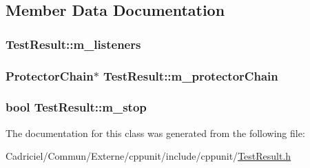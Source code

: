 \subsection{Member Data Documentation}
\hypertarget{class_test_result_a6e5daf8393ca6cdd5a9c3b44074b037b}{
\subsubsection[{m\-\_\-listeners}]{ Test\-Result\-::m\-\_\-listeners\hspace{0.3cm}{\ttfamily [protected]}}}\label{class_test_result_a6e5daf8393ca6cdd5a9c3b44074b037b}
\hypertarget{class_test_result_abb4a702b14af262661a9e02a0193312f}{
\subsubsection[{m\-\_\-protector\-Chain}]{\setlength{\rightskip}{0pt plus 5cm}Protector\-Chain$\ast$ Test\-Result\-::m\-\_\-protector\-Chain\hspace{0.3cm}{\ttfamily [protected]}}}\label{class_test_result_abb4a702b14af262661a9e02a0193312f}
\hypertarget{class_test_result_ab8c04c2021b19f0c8d19bf4675f2bd86}{
\subsubsection[{m\-\_\-stop}]{\setlength{\rightskip}{0pt plus 5cm}bool Test\-Result\-::m\-\_\-stop\hspace{0.3cm}{\ttfamily [protected]}}}\label{class_test_result_ab8c04c2021b19f0c8d19bf4675f2bd86}


The documentation for this class was generated from the following file\-:\begin{DoxyCompactItemize}
\item 
Cadriciel/\-Commun/\-Externe/cppunit/include/cppunit/\hyperlink{_test_result_8h}{Test\-Result.\-h}\end{DoxyCompactItemize}
